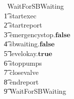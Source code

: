 \documentclass{report}
\newcommand{\true}{\ensuremath{\mathbf{true}}}
\newcommand{\false}{\ensuremath{\mathbf{false}}}
\begin{document}
\begin{circus}
   \circprocess\ WaitForSBWaiting \circdef \circbegin \\
   \t1 \circspot startexec \then \\
        \t2 startreport \then \\
            \t3 emergencystop.\false \then \\
                \t4 sbwaiting.\false \then \\
                   \t5 levelokay.\true \then \\
                        \t6 stoppumps \then \\
                            \t7 closevalve \then \\
                                \t8 endreport \then \\
                                   \t9 WaitForSBWaiting \\
  \circend
\end{circus}
\end{document}
